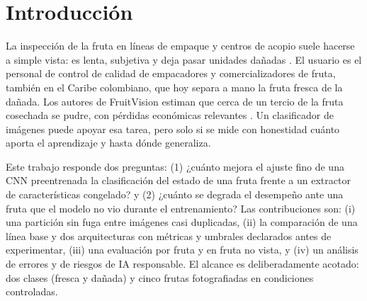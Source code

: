 \documentclass[10pt,twocolumn,letterpaper]{article}
\begin{document}

\section{Introducción}
La inspección de la fruta en líneas de empaque y centros de acopio suele hacerse a simple vista: es lenta, subjetiva y deja pasar unidades dañadas \cite{ism}. El usuario es el personal de control de calidad de empacadores y comercializadores de fruta, también en el Caribe colombiano, que hoy separa a mano la fruta fresca de la dañada. Los autores de FruitVision estiman que cerca de un tercio de la fruta cosechada se pudre, con pérdidas económicas relevantes \cite{fv}. Un clasificador de imágenes puede apoyar esa tarea, pero solo si se mide con honestidad cuánto aporta el aprendizaje y hasta dónde generaliza.

Este trabajo responde dos preguntas: (1) ¿cuánto mejora el ajuste fino de una CNN preentrenada la clasificación del estado de una fruta frente a un extractor de características congelado? y (2) ¿cuánto se degrada el desempeño ante una fruta que el modelo no vio durante el entrenamiento? Las contribuciones son: (i) una partición sin fuga entre imágenes casi duplicadas, (ii) la comparación de una línea base y dos arquitecturas con métricas y umbrales declarados antes de experimentar, (iii) una evaluación por fruta y en fruta no vista, y (iv) un análisis de errores y de riesgos de IA responsable. El alcance es deliberadamente acotado: dos clases (fresca y dañada) y cinco frutas fotografiadas en condiciones controladas.
\end{document}
